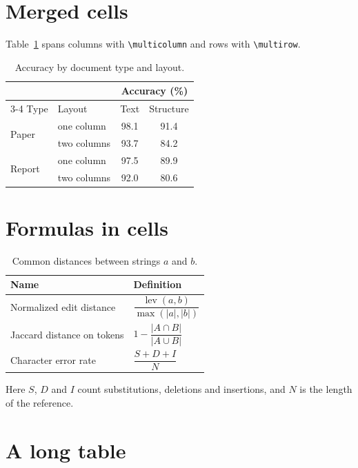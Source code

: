 \documentclass[11pt]{article}
\begin{document}
\section{Merged cells}

Table~\ref{tab:merged} spans columns with \verb|\multicolumn| and rows with
\verb|\multirow|.

\begin{table}[h]
  \centering
  \caption{Accuracy by document type and layout.}
  \label{tab:merged}
  \begin{tabular}{llcc}
    \toprule
    & & \multicolumn{2}{c}{Accuracy (\%)} \\
    \cmidrule(lr){3-4}
    Type & Layout & Text & Structure \\
    \midrule
    \multirow{2}{*}{Paper}  & one column & 98.1 & 91.4 \\
                            & two columns & 93.7 & 84.2 \\
    \midrule
    \multirow{2}{*}{Report} & one column & 97.5 & 89.9 \\
                            & two columns & 92.0 & 80.6 \\
    \bottomrule
  \end{tabular}
\end{table}

\section{Formulas in cells}

\begin{table}[h]
  \centering
  \caption{Common distances between strings $a$ and $b$.}
  \label{tab:math}
  \begin{tabular}{>{\raggedright}p{3.5cm}l}
    \toprule
    Name & Definition \\
    \midrule
    Normalized edit distance & $\dfrac{\operatorname{lev}(a,b)}{\max(|a|,|b|)}$ \\[1.2ex]
    Jaccard distance on tokens & $1 - \dfrac{|A \cap B|}{|A \cup B|}$ \\[1.2ex]
    Character error rate & $\dfrac{S + D + I}{N}$ \\
    \bottomrule
  \end{tabular}
\end{table}

Here $S$, $D$ and $I$ count substitutions, deletions and insertions, and $N$
is the length of the reference.

\section{A long table}
\end{document}
